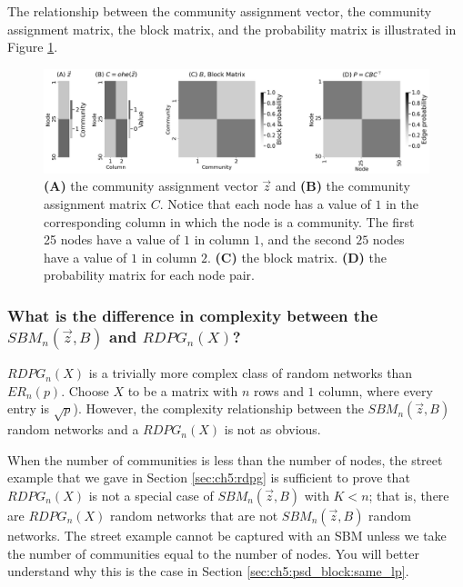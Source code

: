 The relationship between the community assignment vector, the community assignment matrix, the block matrix, and the probability matrix is illustrated in Figure \ref{fig:ch5:ier:sbm}.

\begin{figure}
    \centering
    \includegraphics[width=\linewidth]{representations/ch5/Images/sbm_prob.png}
    \caption[Deriving probability matrix for $SBM_n(\vec z, B)$ random network.]{\textbf{(A)} the community assignment vector $\vec z$ and \textbf{(B)} the community assignment matrix $C$. Notice that each node has a value of $1$ in the corresponding column in which the node is a community. The first 25 nodes have a value of $1$ in column $1$, and the second $25$ nodes have a value of $1$ in column $2$. \textbf{(C)} the block matrix. \textbf{(D)} the probability matrix for each node pair.}
    \label{fig:ch5:ier:sbm}
\end{figure}

\subsubsection{What is the difference in complexity between the $SBM_n(\vec z, B)$ and $RDPG_n(X)$?}
\label{sec:ch5:ier:rdpg_sbm}

$RDPG_n(X)$ is a trivially more complex class of random networks than $ER_n(p)$. Choose $X$ to be a matrix with $n$ rows and $1$ column, where every entry is $\sqrt p$). However, the complexity relationship between the $SBM_n(\vec z, B)$ random networks and a $RDPG_n(X)$ is not as obvious. 

When the number of communities is less than the number of nodes, the street example that we gave in Section \ref{sec:ch5:rdpg} is sufficient to prove that $RDPG_n(X)$ is not a special case of $SBM_n(\vec z, B)$ with $K < n$; that is, there are $RDPG_n(X)$ random networks that are not $SBM_n(\vec z, B)$ random networks. The street example cannot be captured with an SBM unless we take the number of communities equal to the number of nodes. You will better understand why this is the case in Section \ref{sec:ch5:psd_block:same_lp}.

